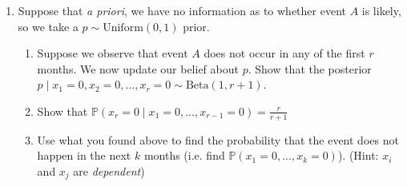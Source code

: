 \documentclass[11pt]{article}
\newcommand{\solution}[1]{{\color{blue} \textit{Solution} : #1}}
\renewcommand{\solution}[1]{}
\begin{document}
\begin{enumerate}
    \item Suppose that \textit{a priori}, we have no information as to whether event $A$ is likely, so we take a $p \sim \text{Uniform}(0, 1)$ prior.
    \begin{enumerate}
    
    \item Suppose we observe that event $A$ does not occur in any of the first $r$ months. We now update our belief about $p$. Show that the posterior $p \mid x_1=0, x_2 = 0, ..., x_r = 0 \sim \text{Beta}(1, r+1)$.
    
    \item Show that $\mathbb{P}(x_r = 0 \mid x_1=0, ..., x_{r-1} = 0) = \frac{r}{r+1}$

    \item Use what you found above to find the probability that the event does not happen in the next $k$ months (i.e. find $\mathbb{P}(x_1 = 0, ..., x_k = 0)$).
    (Hint: $x_i$ and $x_j$ are \textit{dependent}) 
    \end{enumerate}
    
    
    
    \solution{
    \begin{enumerate}
        \item $p \mid x_1 = 0, ..., x_r = 0 \propto \mathbb{P}(x_1 = 0, ..., x_r = 0 \mid p)f_p(p) \\
        \propto (1-p)^r \mathbf{1}_{p \in [0, 1]} \\
        \implies p \mid x_1 = 0, ..., x_r = 0 \sim \text{Beta}(1, r + 1)$
        \item
        \begin{align*}
            \mathbb{P}(x_r = 0 \mid x_1=0, ..., x_{r-1} = 0) &= \int_0^1 \mathbb{P}(x_r = 0, p \in dp \mid x_1=0, ..., x_{r-1} = 0) \\ &*\mathbb{P}(p \in dp \mid x_1 = 0, ..., x_{r-1} = 0)\\
            &= \int_0^1 \mathbb{P}(x_r = 0 \mid p, x_1=0, ..., x_{r-1} = 0)f_{p \mid x_1=0, ..., x_{r-1}=0}(p) dp
            \end{align*}
            We use the fact that $p \mid x_1=0, ..., x_{r-1}=0 \sim \text{Beta}(1, (r-1)+1)$, which was shown above. Continuing, we have
            \begin{align*}\\
            &= \int_0^1 (1-p) \frac{\Gamma(r+1)}{\Gamma(1)\Gamma(r)}p^{1-1}(1-p)^{r-1}dp \\
             \\
             &= \frac{\Gamma(r+1)}{\Gamma(1)\Gamma(r)} \int_0^1 (1-p)^{r}dp \\
             &= \frac{\Gamma(r+1)}{\Gamma(1)\Gamma(r)} \cdot \frac{\Gamma(1)\Gamma(r+1)}{\Gamma(r+2)} \\
             &= \frac{r!}{(r-1)!} \cdot \frac{r!}{(r+1)!} \\
            &= \boxed{\frac{r}{r+1}}
        \end{align*}
        

\end{enumerate}}
\end{enumerate}
\end{document}
